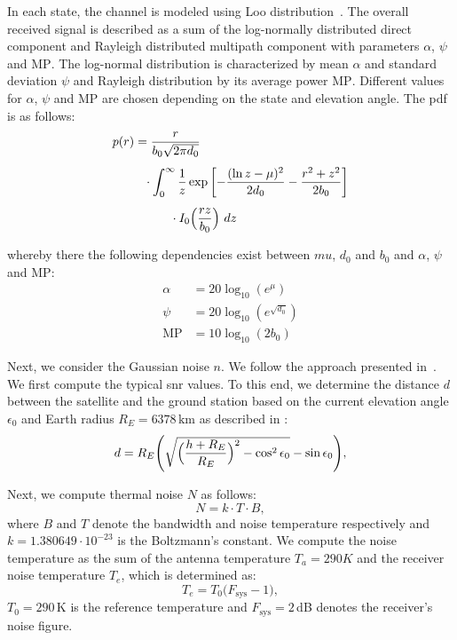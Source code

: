 \documentclass[conference]{IEEEtran}
\newcommand\MP{\ensuremath{\mathrm{MP}}\xspace}
\begin{document}
In each state, the channel is modeled using Loo distribution~\cite{}. 
The overall received signal is described as a sum of the log-normally distributed direct component and Rayleigh distributed multipath component with parameters $\alpha$, $\psi$ and \MP.
The log-normal distribution is characterized by mean $\alpha$ and standard deviation $\psi$ and Rayleigh distribution by its average power \MP.
Different values for $\alpha$, $\psi$ and \MP are chosen depending on the state and elevation angle.
The \ac{pdf} is as follows:
\begin{equation}
  \begin{aligned}
  p(r) &= \frac{r}{b_0\sqrt{2\pi d_0}} \\[1ex]
  &\hphantom{=} \cdot \int_{0}^{\infty}\frac{1}{z} \exp\left[-\frac{(\ln z - \mu)^2}{2d_0} - \frac{r^2 + z^2}{2b_0}\right] \\[1ex]
  &\hphantom{=\int_{0}^{\infty}} \cdot I_0\Big(\frac{rz}{b_0}\Big)\ dz
  \end{aligned}
\end{equation}

whereby there the following dependencies exist between $mu$, $d_0$ and $b_0$ and $\alpha$, $\psi$ and \MP:
\begin{align}
\alpha &= 20\log_{10}(e^\mu) \\
  \psi &= 20\log_{10}(e^{\sqrt{d_0}}) \\
   \MP &= 10\log_{10}(2b_0)
\end{align}

Next, we consider the Gaussian noise $n$. We follow the approach presented in~\cite{LCN23}. 
We first compute the typical \ac{snr} values. 
To this end, we determine the distance $d$ between the satellite and the ground station based on the current elevation angle $\epsilon_0$ and Earth radius $R_E = 6378\,\textrm{km}$ as described in \cite{}:
%
\begin{equation}
  d = R_E\Biggl(\sqrt{\Bigl(\frac{h + R_E}{R_E}\Bigr)^2 - \cos^{2}\epsilon_{0}} - \sin\epsilon_{0}\Biggr),
\end{equation}
%

Next, we compute thermal noise $N$ as follows:
%
\begin{equation}
  N=k \cdot T \cdot B,
\end{equation}
%
where $B$ and $T$ denote the bandwidth and noise temperature respectively and $k = 1.380649 \cdot 10^{-23}$ is the Boltzmann's constant.
We compute the noise temperature as the sum of the antenna temperature $T_a = 290 K$ and the receiver noise temperature $T_e$, which is determined as:
%
\begin{equation}
  T_e = T_0 \big(F_{\mathrm{sys}} - 1 \big),
\end{equation}
%
$T_0 = 290$\,K is the reference temperature and $F_{\textrm{sys}} = 2$\,dB denotes the receiver's noise figure.
\end{document}
